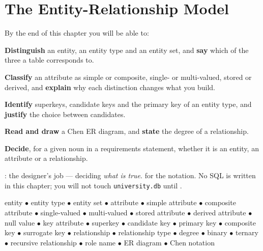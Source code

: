 \chapter{The Entity-Relationship Model}\label{ch:ermodel}

\begin{outcomes}
By the end of this chapter you will be able to:
\begin{tight}
  \item \textbf{Distinguish} an entity, an entity type and an entity set, and
        \textbf{say} which of the three a table corresponds to.
  \item \textbf{Classify} an attribute as simple or composite, single- or
        multi-valued, stored or derived, and \textbf{explain} why each
        distinction changes what you build.
  \item \textbf{Identify} superkeys, candidate keys and the primary key of an
        entity type, and \textbf{justify} the choice between candidates.
  \item \textbf{Read and draw} a Chen ER diagram, and \textbf{state} the degree
        of a relationship.
  \item \textbf{Decide}, for a given noun in a requirements statement, whether
        it is an entity, an attribute or a relationship.
\end{tight}
\end{outcomes}

\begin{prereq}
: the designer's job --- deciding \emph{what is true}.
 for the \relation{}{} notation. No SQL is written in
this chapter; you will not touch \texttt{university.db} until
.
\end{prereq}

\begin{keyterms}
entity $\bullet$ entity type $\bullet$ entity set $\bullet$ attribute
$\bullet$ simple attribute $\bullet$ composite attribute $\bullet$
single-valued $\bullet$ multi-valued $\bullet$ stored attribute $\bullet$
derived attribute $\bullet$ null value $\bullet$ key attribute $\bullet$
superkey $\bullet$ candidate key $\bullet$ primary key $\bullet$ composite key
$\bullet$ surrogate key $\bullet$ relationship $\bullet$ relationship type
$\bullet$ degree $\bullet$ binary $\bullet$ ternary $\bullet$ recursive
relationship $\bullet$ role name $\bullet$ ER diagram $\bullet$ Chen notation
\end{keyterms}

